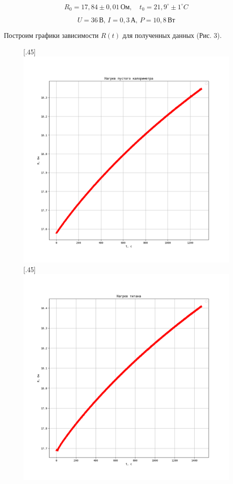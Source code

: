 \documentclass[a4paper, 12pt]{article}
\begin{document}
$$R_{0} = 17,84 \pm 0,01 \, \text{Ом}, \quad t_{0} = 21,9^{\circ} \pm 1 ^{\circ} C$$

$$ U = 36 \, \text{В}, \, I = 0,3 \, \text{А}, \, P = 10,8 \, \text{Вт} $$

\centering
Построим графики зависимости $R(t)$ для полученных данных (Рис. 3).

\begin{figure}[ht]

	[.45\linewidth]{%
    \includegraphics[width=\linewidth]{img/Figure_1.png}%
  }%
  \hfill
  [.45\linewidth]{%
    \includegraphics[width=\linewidth]{img/Figure_2.png}%
  }

\end{figure}
\end{document}
